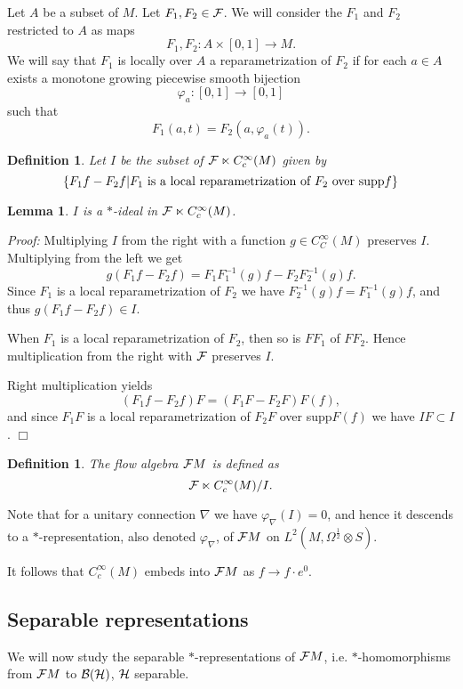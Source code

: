 \documentclass[12pt]{article}
\def\cb{{\cal B}}
\def\ch{{\cal H}}
\newtheorem{lemma}[thm]{Lemma}
\newtheorem{definition}[thm]{Definition}
\newcommand{\cF}{{\cal F}}
\begin{document}
Let $A$ be a subset of $M$. Let $F_1,F_2 \in \cF$. We will consider the $F_1$ and $F_2$ restricted to $A$ as maps 
$$F_1,F_2 : A\times [0,1] \to M . $$ 
We will say that $F_1$ is locally over $A$ a reparametrization of $F_2$ if for each $a\in A$ exists a monotone growing piecewise smooth bijection 
$$\varphi_a :[0,1] \to [0,1] $$  
such that 
$$ F_1 (a,t)=F_2(a,\varphi_a (t)) . $$  
\begin{definition}
Let $I$ be the subset of $\cF  \ltimes C^\infty_c (M)$ given by
$$\{F_1f-F_2 f  | F_1 \hbox{ is a local reparametrization of } F_2\hbox{ over \textnormal{supp}}f    \}  $$
\end{definition}

\begin{lemma}
$I$ is a $*$-ideal in $  \cF  \ltimes C^\infty_c (M) $.
\end{lemma}

\textit{Proof:} Multiplying $I$ from the right with a function $g\in C^\infty_C(M)$ preserves $I$. Multiplying from the left we get
$$g  (F_1f-F_2 f) =F_1 F_1^{-1}(g)f -F_2 F_2^{-1}(g)f    .$$
Since $F_1$ is a local reparametrization of $F_2$ we have $F_2^{-1}(g)f =F_1^{-1}(g)f$, and thus $g  (F_1f-F_2 f) \in I$.

When $F_1$ is a local reparametrization of $F_2$, then so is $FF_1$ of $FF_2$. Hence multiplication from the right with $\cF$ preserves $I$.

Right multiplication yields
$$(F_1f-F_2 f)F=(F_1F -F_2F)F(f) ,       $$
and since $F_1F$ is a local reparametrization of $  F_2F$ over supp$F(f)$ we have $IF \subset I$. \hfill $\Box$

\begin{definition}
The flow algebra $\cF M$ is defined as
$$ \cF  \ltimes C^\infty_c (M) / I.  $$
\end{definition} 

Note that for  a unitary connection $\nabla$ we have $\varphi_\nabla (I)=0$, and hence it descends to a $*$-representation, also denoted $\varphi_\nabla$, of $\cF M$  on $L^2(M,\Omega^{\frac12}\otimes S)$. 

It follows that $C^\infty_c (M)$ embeds into $\cF M$ as $f\to f \cdot e^0$.

\subsection{Separable representations}

We will now study the separable $*$-representations of $\cF M$, i.e. $*$-homomorphisms from $\cF M$ to $\cb (\ch ) $, $\ch$ separable. 
 
\end{document}
